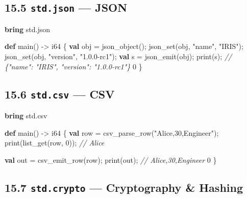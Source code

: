 \documentclass[
  english,
]{book}
\newenvironment{Shaded}{\begin{snugshade}}{\end{snugshade}}
\newcommand{\CommentTok}[1]{\textcolor[rgb]{0.42,0.60,0.33}{\textit{#1}}}
\newcommand{\DataTypeTok}[1]{\textcolor[rgb]{0.31,0.79,0.69}{#1}}
\newcommand{\DecValTok}[1]{\textcolor[rgb]{0.71,0.81,0.66}{#1}}
\newcommand{\FunctionTok}[1]{\textcolor[rgb]{0.86,0.86,0.67}{#1}}
\newcommand{\KeywordTok}[1]{\textcolor[rgb]{0.34,0.61,0.84}{\textbf{#1}}}
\newcommand{\NormalTok}[1]{\textcolor[rgb]{0.83,0.83,0.83}{#1}}
\newcommand{\OperatorTok}[1]{\textcolor[rgb]{0.83,0.83,0.83}{#1}}
\newcommand{\StringTok}[1]{\textcolor[rgb]{0.81,0.57,0.47}{#1}}
\begin{document}
\subsection{\texorpdfstring{15.5 \texttt{std.json} ---
JSON}{15.5 std.json --- JSON}}\label{std.json-json}

\begin{Shaded}
\begin{Highlighting}[]
\KeywordTok{bring}\NormalTok{ std}\OperatorTok{.}\NormalTok{json}

\KeywordTok{def}\NormalTok{ main() }\OperatorTok{{-}\textgreater{}} \DataTypeTok{i64}\NormalTok{ \{}
    \KeywordTok{val}\NormalTok{ obj }\OperatorTok{=}\NormalTok{ json\_object();}
\NormalTok{    json\_set(obj, }\StringTok{"name"}\NormalTok{, }\StringTok{"IRIS"}\NormalTok{);}
\NormalTok{    json\_set(obj, }\StringTok{"version"}\NormalTok{, }\StringTok{"1.0.0{-}rc1"}\NormalTok{);}
    \KeywordTok{val}\NormalTok{ s }\OperatorTok{=}\NormalTok{ json\_emit(obj);}
    \FunctionTok{print}\NormalTok{(s);   }\CommentTok{// \{"name": "IRIS", "version": "1.0.0{-}rc1"\}}
    \DecValTok{0}
\NormalTok{\}}
\end{Highlighting}
\end{Shaded}

\subsection{\texorpdfstring{15.6 \texttt{std.csv} ---
CSV}{15.6 std.csv --- CSV}}\label{std.csv-csv}

\begin{Shaded}
\begin{Highlighting}[]
\KeywordTok{bring}\NormalTok{ std}\OperatorTok{.}\NormalTok{csv}

\KeywordTok{def}\NormalTok{ main() }\OperatorTok{{-}\textgreater{}} \DataTypeTok{i64}\NormalTok{ \{}
    \KeywordTok{val}\NormalTok{ row }\OperatorTok{=}\NormalTok{ csv\_parse\_row(}\StringTok{"Alice,30,Engineer"}\NormalTok{);}
    \FunctionTok{print}\NormalTok{(}\FunctionTok{list\_get}\NormalTok{(row, }\DecValTok{0}\NormalTok{));   }\CommentTok{// Alice}

    \KeywordTok{val}\NormalTok{ out }\OperatorTok{=}\NormalTok{ csv\_emit\_row(row);}
    \FunctionTok{print}\NormalTok{(out);   }\CommentTok{// Alice,30,Engineer}
    \DecValTok{0}
\NormalTok{\}}
\end{Highlighting}
\end{Shaded}

\subsection{\texorpdfstring{15.7 \texttt{std.crypto} --- Cryptography \&
Hashing}{15.7 std.crypto --- Cryptography \& Hashing}}\label{std.crypto-cryptography-hashing}
\end{document}
